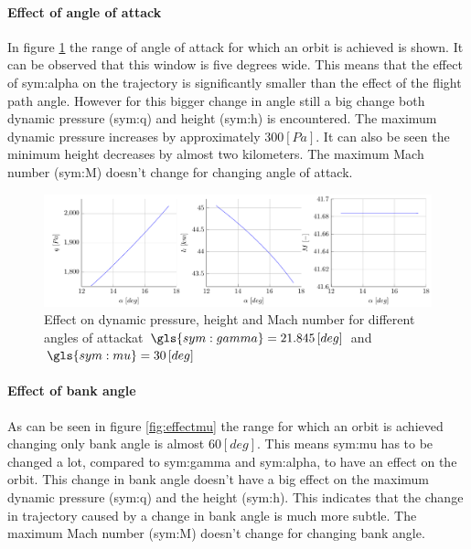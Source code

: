 \paragraph{Effect of angle of attack}

In figure \ref{fig:effectalpha} the range of angle of attack for which an orbit is achieved is shown. It can be observed that this window is five degrees wide. This means that the effect of \gls{sym:alpha} on the trajectory is significantly smaller than the effect of the flight path angle. However for this bigger change in angle still a big change both dynamic pressure (\gls{sym:q}) and height (\gls{sym:h}) is encountered. The maximum dynamic pressure increases by approximately $300 \left[Pa\right]$. It can also be seen the minimum height decreases by almost two kilometers. The maximum Mach number (\gls{sym:M}) doesn't change for changing angle of attack.

\begin{figure}[ht!]
	\centering
	\includegraphics[width=\textwidth]{./Figure/orbit/effectalpha.pdf}
	\caption{Effect on dynamic pressure, height and Mach number for different angles of attackat $\gls{sym:gamma}=21.845 \left[deg\right]$ and $\gls{sym:mu}=30 \left[deg\right]$}
	\label{fig:effectalpha}
\end{figure}

\paragraph{Effect of bank angle}

As can be seen in figure \ref{fig:effectmu} the range for which an orbit is achieved changing only bank angle is almost $60 \left[deg\right]$. This means \gls{sym:mu} has to be changed a lot, compared to \gls{sym:gamma} and \gls{sym:alpha}, to have an effect on the orbit. This change in bank angle doesn't have a big effect on the maximum dynamic pressure (\gls{sym:q}) and the height (\gls{sym:h}). This indicates that the change in trajectory caused by a change in bank angle is much more subtle. The maximum Mach number (\gls{sym:M}) doesn't change for changing bank angle.

